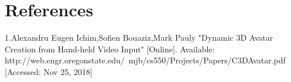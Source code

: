 \documentclass[12pt,a4paper,titlepage]{article}
\begin{document}
\section{References}{
1.Alexandru Eugen Ichim,Sofien Bouaziz,Mark Pauly  "Dynamic 3D Avatar Creation from Hand-held Video Input" [Online]. Available: http://web.engr.oregonstate.edu/~mjb/cs550/Projects/Papers/C3DAvatar.pdf [Accessed: Nov 25, 2018]
\newline
}
\label{sec:q8sec}
\end{document}
